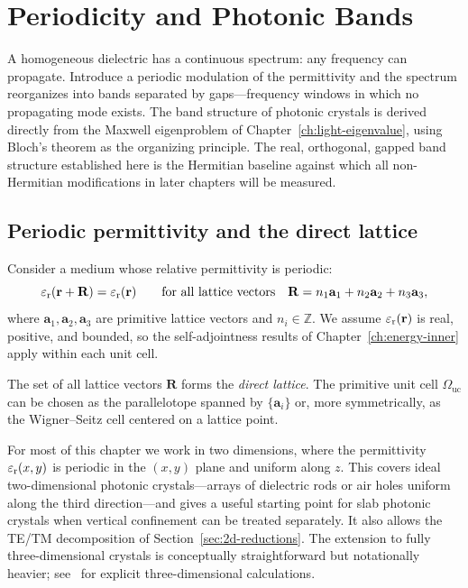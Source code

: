 \chapter{Periodicity and Photonic Bands}
\label{ch:periodicity}

\begin{chapterlead}
A homogeneous dielectric has a continuous spectrum: any frequency can
propagate. Introduce a periodic modulation of the permittivity and the
spectrum reorganizes into bands separated by gaps---frequency windows in
which no propagating mode exists. The band structure of photonic
crystals is derived directly from the Maxwell eigenproblem of
Chapter~\ref{ch:light-eigenvalue}, using Bloch's theorem as the organizing
principle. The real, orthogonal, gapped band structure established here is
the Hermitian baseline against which all non-Hermitian modifications in
later chapters will be measured.
\end{chapterlead}


\section{Periodic permittivity and the direct lattice}
\label{sec:periodic-eps}

Consider a medium whose relative permittivity is periodic:
\begin{equation}
 \varepsilon_{\mathrm{r}}(\mathbf{r} + \mathbf{R}) = \varepsilon_{\mathrm{r}}(\mathbf{r})
 \qquad\text{for all lattice vectors}\quad
 \mathbf{R} = n_1\mathbf{a}_1 + n_2\mathbf{a}_2 + n_3\mathbf{a}_3,
 \label{eq:periodic-eps}
\end{equation}
where $\mathbf{a}_1, \mathbf{a}_2, \mathbf{a}_3$ are primitive lattice
vectors and $n_i \in \mathbb{Z}$. We assume $\varepsilon_{\mathrm{r}}(\mathbf{r})$ is real,
positive, and bounded, so the self-adjointness results of
Chapter~\ref{ch:energy-inner} apply within each unit cell.

The set of all lattice vectors $\mathbf{R}$ forms the \emph{direct
lattice}. The primitive unit cell $\Omega_{\mathrm{uc}}$ can be chosen
as the parallelotope spanned by $\{\mathbf{a}_i\}$ or, more symmetrically,
as the Wigner--Seitz cell centered on a lattice point.

For most of this chapter we work in two dimensions, where the permittivity
$\varepsilon_{\mathrm{r}}(x,y)$ is periodic in the $(x,y)$ plane and uniform along $z$.
This covers ideal two-dimensional photonic crystals---arrays of dielectric
rods or air holes uniform along the third direction---and gives a useful
starting point for slab photonic crystals when vertical confinement can be
treated separately. It also allows the TE/TM decomposition of
Section~\ref{sec:2d-reductions}. The extension to fully three-dimensional
crystals is conceptually straightforward but notationally heavier;
see~\cite{paz2019tutorial} for explicit three-dimensional calculations.


